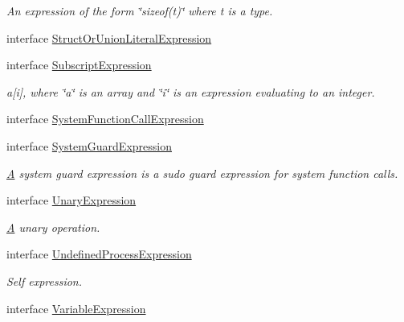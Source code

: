 \begin{DoxyCompactItemize}
\begin{DoxyCompactList}\small\item\em An expression of the form \char`\"{}sizeof(t)\char`\"{} where t is a type. \end{DoxyCompactList}\item 
interface \hyperlink{interfaceedu_1_1udel_1_1cis_1_1vsl_1_1civl_1_1model_1_1IF_1_1expression_1_1StructOrUnionLiteralExpression}{Struct\+Or\+Union\+Literal\+Expression}
\item 
interface \hyperlink{interfaceedu_1_1udel_1_1cis_1_1vsl_1_1civl_1_1model_1_1IF_1_1expression_1_1SubscriptExpression}{Subscript\+Expression}
\begin{DoxyCompactList}\small\item\em a\mbox{[}i\mbox{]}, where \char`\"{}a\char`\"{} is an array and \char`\"{}i\char`\"{} is an expression evaluating to an integer. \end{DoxyCompactList}\item 
interface \hyperlink{interfaceedu_1_1udel_1_1cis_1_1vsl_1_1civl_1_1model_1_1IF_1_1expression_1_1SystemFunctionCallExpression}{System\+Function\+Call\+Expression}
\item 
interface \hyperlink{interfaceedu_1_1udel_1_1cis_1_1vsl_1_1civl_1_1model_1_1IF_1_1expression_1_1SystemGuardExpression}{System\+Guard\+Expression}
\begin{DoxyCompactList}\small\item\em \hyperlink{structA}{A} system guard expression is a sudo guard expression for system function calls. \end{DoxyCompactList}\item 
interface \hyperlink{interfaceedu_1_1udel_1_1cis_1_1vsl_1_1civl_1_1model_1_1IF_1_1expression_1_1UnaryExpression}{Unary\+Expression}
\begin{DoxyCompactList}\small\item\em \hyperlink{structA}{A} unary operation. \end{DoxyCompactList}\item 
interface \hyperlink{interfaceedu_1_1udel_1_1cis_1_1vsl_1_1civl_1_1model_1_1IF_1_1expression_1_1UndefinedProcessExpression}{Undefined\+Process\+Expression}
\begin{DoxyCompactList}\small\item\em Self expression. \end{DoxyCompactList}\item 
interface \hyperlink{interfaceedu_1_1udel_1_1cis_1_1vsl_1_1civl_1_1model_1_1IF_1_1expression_1_1VariableExpression}{Variable\+Expression}

\end{DoxyCompactItemize}
